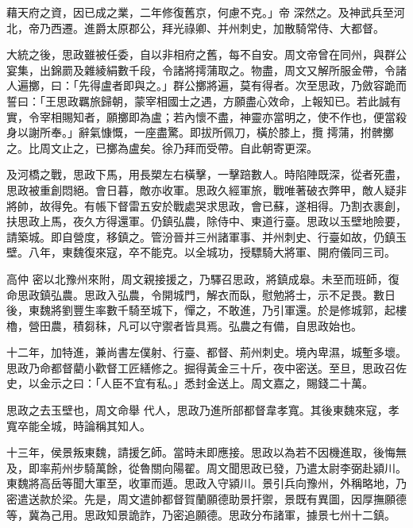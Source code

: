 \begin{pinyinscope}
 藉天府之資，因已成之業，二年修復舊京，何慮不克。」帝
 深然之。及神武兵至河北，帝乃西遷。進爵太原郡公，拜光祿卿、并州刺史，加散騎常侍、大都督。



 大統之後，思政雖被任委，自以非相府之舊，每不自安。周文帝曾在同州，與群公宴集，出錦罽及雜綾絹數千段，令諸將摴蒲取之。物盡，周文又解所服金帶，令諸人遍擲，曰：「先得盧者即與之。」群公擲將遍，莫有得者。次至思政，乃斂容跪而誓曰：「王思政羈旅歸朝，蒙宰相國士之遇，方願盡心效命，上報知已。若此誠有實，令宰相賜知者，願擲即為盧；若內懷不盡，神靈亦當明之，使不作也，便當殺身以謝所奉。」辭氣慷慨，一座盡驚。即拔所佩刀，橫於膝上，攬
 摴蒲，拊髀擲之。比周文止之，已擲為盧矣。徐乃拜而受帶。自此朝寄更深。



 及河橋之戰，思政下馬，用長槊左右橫擊，一擊踣數人。時陷陣既深，從者死盡，思政被重創悶絕。會日暮，敵亦收軍。思政久經軍旅，戰唯著破衣弊甲，敵人疑非將帥，故得免。有帳下督雷五安於戰處哭求思政，會已蘇，遂相得。乃割衣裹創，扶思政上馬，夜久方得還軍。仍鎮弘農，除侍中、東道行臺。思政以玉壁地險要，請築城。即自營度，移鎮之。管汾晉并三州諸軍事、并州刺史、行臺如故，仍鎮玉壁。八年，東魏復來寇，卒不能克。以全城功，授驃騎大將軍、開府儀同三司。



 高仲
 密以北豫州來附，周文親接援之，乃驛召思政，將鎮成皋。未至而班師，復命思政鎮弘農。思政入弘農，令開城門，解衣而臥，慰勉將士，示不足畏。數日後，東魏將劉豐生率數千騎至城下，憚之，不敢進，乃引軍還。於是修城郭，起樓櫓，營田農，積芻秣，凡可以守禦者皆具焉。弘農之有備，自思政始也。



 十二年，加特進，兼尚書左僕射、行臺、都督、荊州刺史。境內卑濕，城塹多壞。思政乃命都督藺小歡督工匠繕修之。掘得黃金三十斤，夜中密送。至旦，思政召佐史，以金示之曰：「人臣不宜有私。」悉封金送上。周文嘉之，賜錢二十萬。



 思政之去玉壁也，周文命舉
 代人，思政乃進所部都督韋孝寬。其後東魏來寇，孝寬卒能全城，時論稱其知人。



 十三年，侯景叛東魏，請援乞師。當時未即應接。思政以為若不因機進取，後悔無及，即率荊州步騎萬餘，從魯關向陽翟。周文聞思政已發，乃遣太尉李弼赴潁川。東魏將高岳等聞大軍至，收軍而遁。思政入守潁川。景引兵向豫州，外稱略地，乃密遣送款於梁。先是，周文遣帥都督賀蘭願德助景扞禦，景既有異圖，因厚撫願德等，冀為己用。思政知景詭詐，乃密追願德。思政分布諸軍，據景七州十二鎮。




\end{pinyinscope}
